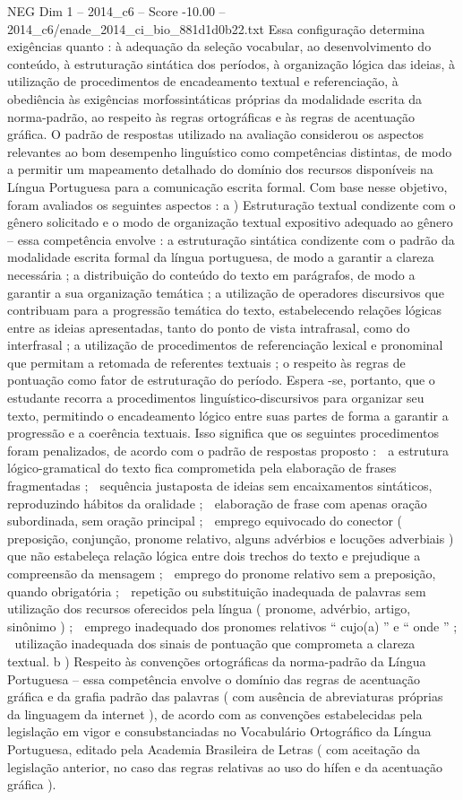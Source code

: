\begin{textsample}{NEG Dim 1 – 2014\_c6 – Score -10.00 – 2014\_c6/enade\_2014\_ci\_bio\_881d1d0b22.txt}
Essa configuração determina exigências quanto : à adequação da seleção vocabular, ao desenvolvimento do conteúdo, à estruturação sintática dos períodos, à organização lógica das ideias, à utilização de procedimentos de encadeamento textual e referenciação, à obediência às exigências morfossintáticas próprias da modalidade escrita da norma-padrão, ao respeito às regras ortográficas e às regras de acentuação gráfica.
O padrão de respostas utilizado na avaliação considerou os aspectos relevantes ao bom desempenho linguístico como competências distintas, de modo a permitir um mapeamento detalhado do domínio dos recursos disponíveis na Língua Portuguesa para a comunicação escrita formal.
Com base nesse objetivo, foram avaliados os seguintes aspectos : a ) Estruturação textual condizente com o gênero solicitado e o modo de organização textual expositivo adequado ao gênero – essa competência envolve : a estruturação sintática condizente com o padrão da modalidade escrita formal da língua portuguesa, de modo a garantir a clareza necessária ; a distribuição do conteúdo do texto em parágrafos, de modo a garantir a sua organização temática ; a utilização de operadores discursivos que contribuam para a progressão temática do texto, estabelecendo relações lógicas entre as ideias apresentadas, tanto do ponto de vista intrafrasal, como do interfrasal ; a utilização de procedimentos de referenciação lexical e pronominal que permitam a retomada de referentes textuais ; o respeito às regras de pontuação como fator de estruturação do período.
Espera -se, portanto, que o estudante recorra a procedimentos linguístico-discursivos para organizar seu texto, permitindo o encadeamento lógico entre suas partes de forma a garantir a progressão e a coerência textuais.
Isso significa que os seguintes procedimentos foram penalizados, de acordo com o padrão de respostas proposto :  a estrutura lógico-gramatical do texto fica comprometida pela elaboração de frases fragmentadas ;  sequência justaposta de ideias sem encaixamentos sintáticos, reproduzindo hábitos da oralidade ;  elaboração de frase com apenas oração subordinada, sem oração principal ;  emprego equivocado do conector ( preposição, conjunção, pronome relativo, alguns advérbios e locuções adverbiais ) que não estabeleça relação lógica entre dois trechos do texto e prejudique a compreensão da mensagem ;  emprego do pronome relativo sem a preposição, quando obrigatória ;  repetição ou substituição inadequada de palavras sem utilização dos recursos oferecidos pela língua ( pronome, advérbio, artigo, sinônimo ) ;  emprego inadequado dos pronomes relativos “ cujo(a) ” e “ onde ” ;  utilização inadequada dos sinais de pontuação que comprometa a clareza textual. b ) Respeito às convenções ortográficas da norma-padrão da Língua Portuguesa – essa competência envolve o domínio das regras de acentuação gráfica e da grafia padrão das palavras ( com ausência de abreviaturas próprias da linguagem da internet ), de acordo com as convenções estabelecidas pela legislação em vigor e consubstanciadas no Vocabulário Ortográfico da Língua Portuguesa, editado pela Academia Brasileira de Letras ( com aceitação da legislação anterior, no caso das regras relativas ao uso do hífen e da acentuação gráfica ).

\end{textsample}
